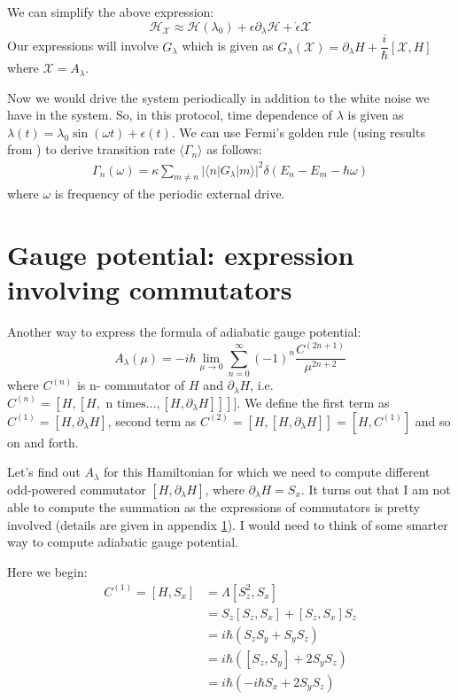 \documentclass[11pt,a4paper]{article}
\begin{document}
We can simplify the above expression:
\begin{equation}
\mathcal{H}_{\mathcal{X}} \approx \mathcal{H} (\lambda_0)+ \epsilon \partial_{\lambda}\mathcal{H} + \dot{\epsilon} \mathcal{X}
\end{equation}
Our expressions will involve $G_{\lambda}$ which is given as $G_{\lambda}(\mathcal{X} )= \partial_{\lambda} H + \dfrac{i}{\hbar} [\mathcal{X}, H] $ where $\mathcal{X}=A_{\lambda}$.


Now we would drive the system periodically in addition to the white noise we have in the system. So, in this protocol, time dependence of $\lambda$ is given as $\lambda(t)= \lambda_0 \sin (\omega t) + \epsilon(t)$. We can use Fermi's golden rule (using results from \cite{clerk2010introduction}) to derive  transition rate $\langle \Gamma_n \rangle$ \cite{kolodrubetz2016geometry} as follows: 
\begin{align}
 \Gamma_n (\omega) = \kappa  \sum_{m \neq n} |\langle n | G_{\lambda} | m \rangle |^2 \delta(E_n-E_m- \hbar \omega)
\end{align}
where $\omega$ is frequency of the periodic external drive.


\section{Gauge potential: expression involving commutators}\label{sec.potn}

Another way to express the formula of adiabatic gauge potential:
\begin{equation}
 A_{\lambda}(\mu) =  -i\hbar \lim_{\mu \rightarrow 0} \sum_{n=0}^{\infty}   (-1)^{n} \dfrac{ C^{(2n+1)}}{\mu^{2n+2}}
\end{equation}
where $C^{(n)}$ is n- commutator of $H$ and $\partial_{\lambda} H$, i.e. $C^{(n)}= [H, [H, \mbox{ n times} \ldots,[H, \partial_{\lambda} H ]]] ] $.  We define the first term as $C^{(1)}= [H, \partial_{\lambda}H]$, second term as $C^{(2)}= [H,[H, \partial_{\lambda}H]]= [H, C^{(1)}]$ and so on and forth.

Let's find out $A_{\lambda}$ for this Hamiltonian for which we need to compute different odd-powered commutator $[H, \partial_{\lambda} H]$, where $\partial_{\lambda} H=S_x$. It turns out that I am not able to compute the summation as the expressions of commutators is pretty involved (details are given in appendix \ref{sec.potn}). I would need to think of some smarter way to compute adiabatic gauge potential.

Here we begin:
\begin{align*}
C^{(1)}=[H,S_x] &= \Lambda  [S_z^2, S_x] \\
&= S_z[S_z, S_x] + [S_z, S_x] S_z \\
&= i \hbar (S_z S_y + S_y S_z) \\
&=i \hbar ([S_z, S_y] +  2 S_y S_z)\\
&=i \hbar (- i \hbar S_x +  2 S_y S_z)
\end{align*}
\end{document}
